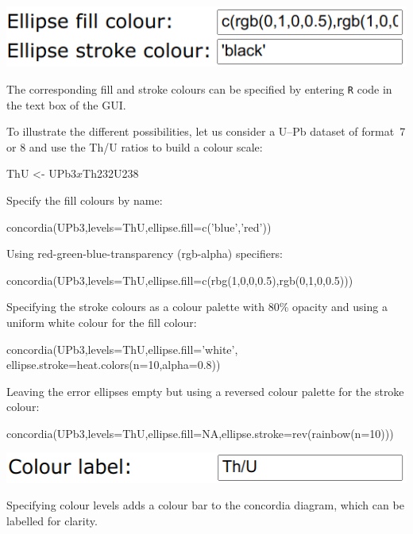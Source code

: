 \begin{refsection}
\begin{enumerate}
  \noindent\begin{minipage}[t]{.4\linewidth}
  \strut\vspace*{-\baselineskip}\newline
  \includegraphics[width=\linewidth]{../figures/ConcordiaColours.png}
\end{minipage}
\begin{minipage}[t]{.6\linewidth}
  The corresponding fill and stroke colours can be specified by
  entering \texttt{R} code in the text box of the GUI.\\
\end{minipage}

\noindent To illustrate the different possibilities, let us consider a
U--Pb dataset of format~7 or 8 and use the Th/U ratios to build a
colour scale:
\begin{console}
ThU <- UPb3$x$Th232U238
\end{console}

\noindent Specify the fill colours by name:
\begin{console}
concordia(UPb3,levels=ThU,ellipse.fill=c('blue','red'))
\end{console}

\noindent Using red-green-blue-transparency (rgb-alpha) specifiers:
\begin{console}
concordia(UPb3,levels=ThU,ellipse.fill=c(rbg(1,0,0,0.5),rgb(0,1,0,0.5)))
\end{console}

\noindent Specifying the stroke colours as a colour palette with 80\% opacity
and using a uniform white colour for the fill colour:
\begin{script}
concordia(UPb3,levels=ThU,ellipse.fill='white',
          ellipse.stroke=heat.colors(n=10,alpha=0.8))
\end{script}

\noindent Leaving the error ellipses empty but using a reversed colour palette
for the stroke colour:
\begin{console}
concordia(UPb3,levels=ThU,ellipse.fill=NA,ellipse.stroke=rev(rainbow(n=10)))
\end{console}

\noindent\begin{minipage}[t]{.4\linewidth}
\strut\vspace*{-\baselineskip}\newline
\includegraphics[width=\linewidth]{../figures/UPbColourLabel.png}
\end{minipage}
\begin{minipage}[t]{.6\linewidth}
  Specifying colour levels adds a colour bar to the concordia diagram,
  which can be labelled for clarity.
\end{minipage}


\end{enumerate}
\end{refsection}
